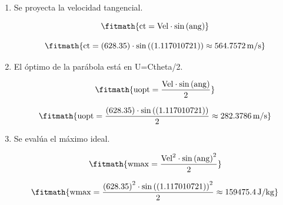 \begin{enumerate}

\item Se proyecta la velocidad tangencial.

\[\fitmath{\mathrm{ct}=\mathrm{Vel}\cdot \sin\left(\mathrm{ang}\right)}\]

\[\fitmath{\mathrm{ct}=(628.35)\cdot \sin\left((1.117010721)\right)\approx 564.7572\,\mathrm{m/s}}\]

\item El óptimo de la parábola está en U=Ctheta/2.

\[\fitmath{\mathrm{uopt}=\frac{\mathrm{Vel}\cdot \sin\left(\mathrm{ang}\right)}{2}}\]

\[\fitmath{\mathrm{uopt}=\frac{(628.35)\cdot \sin\left((1.117010721)\right)}{2}\approx 282.3786\,\mathrm{m/s}}\]

\item Se evalúa el máximo ideal.

\[\fitmath{\mathrm{wmax}=\frac{{\mathrm{Vel}}^{2}\cdot {\sin\left(\mathrm{ang}\right)}^{2}}{2}}\]

\[\fitmath{\mathrm{wmax}=\frac{{(628.35)}^{2}\cdot {\sin\left((1.117010721)\right)}^{2}}{2}\approx 159475.4\,\mathrm{J/kg}}\]

\end{enumerate}
